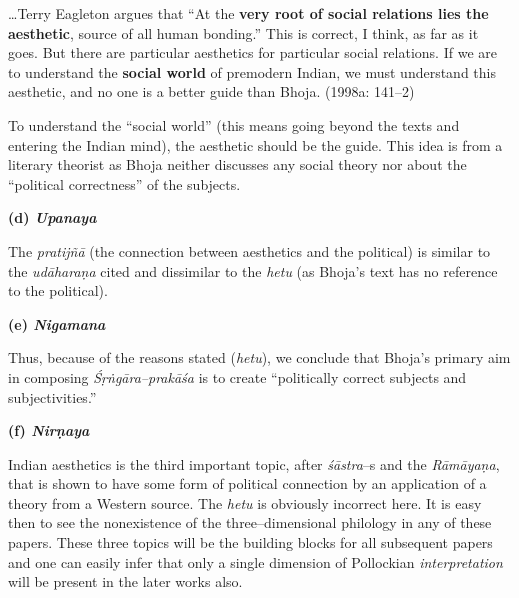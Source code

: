\begin{myquote}
…Terry Eagleton argues that “At the \textbf{very root of social relations lies the aesthetic}, source of all human bonding.” This is correct, I think, as far as it goes. But there are particular aesthetics for particular social relations. If we are to understand the \textbf{social world} of premodern Indian, we must understand this aesthetic, and no one is a better guide than Bhoja. (1998a: 141–2)
\end{myquote}

To understand the “social world” (this means going beyond the texts and entering the Indian mind), the aesthetic should be the guide. This idea is from a literary theorist as Bhoja neither discusses any social theory nor about the “political correctness” of the subjects.

\textbf{(d) \textit{Upanaya}}

The \textit{pratijñā} (the connection between aesthetics and the political) is similar to the \textit{udāharaṇa} cited and dissimilar to the \textit{hetu} (as Bhoja’s text has no reference to the political).

\textbf{(e) \textit{Nigamana}}

Thus, because of the reasons stated (\textit{hetu}), we conclude that Bhoja’s primary aim in composing \textit{Śṛṅgāra–prakāśa} is to create “politically correct subjects and subjectivities.”

\textbf{(f) \textit{Nirṇaya}}

Indian aesthetics is the third important topic, after \textit{śāstra}–s and the \textit{Rāmāyaṇa}, that is shown to have some form of political connection by an application of a theory from a Western source. The \textit{hetu} is obviously incorrect here. It is easy then to see the nonexistence of the three–dimensional philology in any of these papers. These three topics will be the building blocks for all subsequent papers and one can easily infer that only a single dimension of Pollockian \textit{interpretation} will be present in the later works also.

\vspace{-.5cm}

